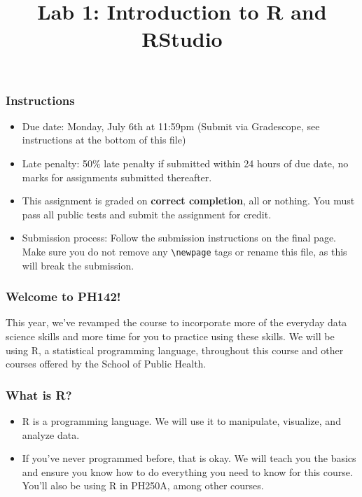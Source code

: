 \documentclass[
]{article}
\title{Lab 1: Introduction to R and RStudio}
\author{}
\date{\vspace{-2.5em}}
\providecommand{\tightlist}{%
  \setlength{\itemsep}{0pt}\setlength{\parskip}{0pt}}
\begin{document}
\maketitle

\subsubsection{Instructions}\label{instructions}

\begin{itemize}
\tightlist
\item
  Due date: Monday, July 6th at 11:59pm (Submit via Gradescope, see
  instructions at the bottom of this file)
\item
  Late penalty: 50\% late penalty if submitted within 24 hours of due
  date, no marks for assignments submitted thereafter.
\item
  This assignment is graded on \textbf{correct completion}, all or
  nothing. You must pass all public tests and submit the assignment for
  credit.
\item
  Submission process: Follow the submission instructions on the final
  page. Make sure you do not remove any \texttt{\textbackslash{}newpage}
  tags or rename this file, as this will break the submission.
\end{itemize}

\subsubsection{Welcome to PH142!}\label{welcome-to-ph142}

This year, we've revamped the course to incorporate more of the everyday
data science skills and more time for you to practice using these
skills. We will be using R, a statistical programming language,
throughout this course and other courses offered by the School of Public
Health.

\subsubsection{What is R?}\label{what-is-r}

\begin{itemize}
\tightlist
\item
  R is a programming language. We will use it to manipulate, visualize,
  and analyze data.
\item
  If you've never programmed before, that is okay. We will teach you the
  basics and ensure you know how to do everything you need to know for
  this course. You'll also be using R in PH250A, among other courses.
\end{itemize}
\end{document}
